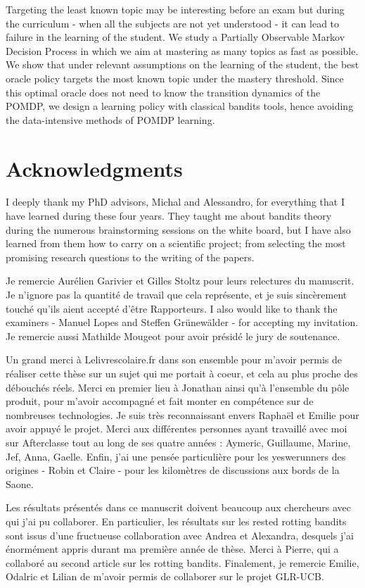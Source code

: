 Targeting the least known topic may be interesting before an exam but during the curriculum - when all the subjects are not yet understood - it can lead to failure in the learning of the student. We study a Partially Observable Markov Decision Process in which we aim at mastering as many topics as fast as possible. We show that under relevant assumptions on the learning of the student, the best oracle policy targets the most known topic under the mastery threshold. Since this optimal oracle does not need to know the transition dynamics of the POMDP, we design a learning policy with classical bandits tools, hence avoiding the data-intensive methods of POMDP learning. 
\newpage

\section*{Acknowledgments}

I deeply thank my PhD advisors, Michal and Alessandro, for everything that I have learned during these four years. They taught me about bandits theory during the numerous brainstorming sessions on the white board, but I have also learned from them how to carry on a scientific project; from selecting the most promising research questions to the writing of the papers.

Je remercie Aurélien Garivier et Gilles Stoltz pour leurs relectures du manuscrit. Je n'ignore pas la quantité de travail que cela représente, et je suis sincèrement touché qu'ils aient accepté d'être Rapporteurs. I also would like to thank the examiners - Manuel Lopes and Steffen Grünewälder -  for accepting my invitation. Je remercie aussi Mathilde Mougeot pour avoir présidé le jury de soutenance.

Un grand merci à Lelivrescolaire.fr dans son ensemble pour m'avoir permis de réaliser cette thèse sur un sujet qui me portait à coeur, et cela au plus proche des débouchés réels. Merci en premier lieu à Jonathan ainsi qu'à l'ensemble du pôle produit, pour m'avoir accompagné et fait monter en compétence sur de nombreuses technologies. Je suis très reconnaissant envers Raphaël et Emilie pour avoir appuyé le projet. Merci aux différentes personnes ayant travaillé avec moi sur Afterclasse tout au long de ses quatre années : Aymeric, Guillaume, Marine, Jef, Anna, Gaelle. Enfin, j'ai une pensée particulière pour les yeswerunners des origines - Robin et Claire - pour les kilomètres de discussions aux bords de la Saone.

Les résultats présentés dans ce manuscrit doivent beaucoup aux chercheurs avec qui j'ai pu collaborer. En particulier, les résultats sur les rested rotting bandits sont issus d'une fructueuse collaboration avec Andrea et Alexandra, desquels j'ai énormément appris durant ma première année de thèse. Merci à Pierre, qui a collaboré au second article sur les rotting bandits. Finalement, je remercie Emilie, Odalric et Lilian de m'avoir permis de collaborer sur le projet GLR-UCB. 


